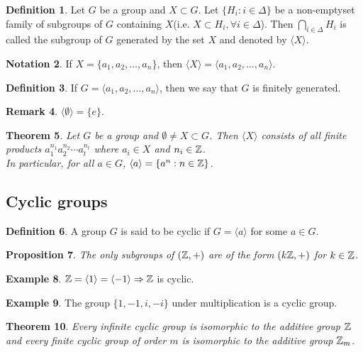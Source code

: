 \documentclass[leqno,DIV=calc,paper=a4,fontsize=11pt]{article}
\newtheorem{thm}{Theorem}[section]
\newtheorem{prop}[thm]{Proposition}
\theoremstyle{definition}
\newtheorem{defn}[thm]{Definition}
\newtheorem{exmp}[thm]{Example}
\newtheorem{notn}[thm]{Notation}
\newtheorem{rem}[thm]{Remark}
\theoremstyle{plain}
\theoremstyle{remark}
\begin{document}
\begin{defn}
Let $G$ be a group and $X\subset G$. Let $\{H_i:i\in \Delta\}$ be a non-emptyset family of subgroups of $G$ containing $X$(i.e. $X\subset H_i,\forall i\in \Delta$). Then $\bigcap_{i\in \Delta}H_i$ is called the subgroup of $G$ generated by the set $X$ and denoted by $\langle X\rangle$.
\end{defn}
\begin{notn}
If $X=\{a_1,a_2,\ldots,a_n\}$, then $\langle X\rangle=\langle a_1,a_2,\ldots,a_n\rangle$.
\end{notn}

\begin{defn}
If $G=\langle a_1,a_2,\ldots,a_n\rangle$, then we say that $G$ is finitely generated.
\end{defn}
\begin{rem}
$\langle \emptyset\rangle =\{e\}$.
\end{rem}

\begin{thm}
Let $G$ be a group and $\emptyset\neq X\subset G$. Then $\langle X\rangle$ consists of all finite products $a_1^{n_1}a_2^{n_2}\cdots a_t^{n_t}$ where $a_i\in X$ and $n_i\in \Bbb Z$.\\
In particular, for all $a\in G$, $\langle a\rangle=\{a^n:n\in \Bbb Z\}$.
\end{thm}

\subsection{Cyclic groups}

\begin{defn}
A group $G$ is said to be cyclic if $G=\langle a\rangle$ for some $a\in G$.
\end{defn}
\begin{prop}
The only subgroups of $(\Bbb Z,+)$ are of the form $(k\Bbb Z,+)$ for $k\in \Bbb Z$.
\end{prop}

\begin{exmp}
$\Bbb Z=\langle 1\rangle =\langle -1\rangle\Rightarrow \Bbb Z$ is cyclic.
\end{exmp}
\begin{exmp}
The group $\{1,-1,i,-i\}$ under multiplication is a cyclic group.
\end{exmp}

\begin{thm}
Every infinite cyclic group is isomorphic to the additive group $\Bbb Z$ and every finite cyclic group of order $m$ is isomorphic to the additive group $\Bbb Z_m$.
\end{thm}
\end{document}
